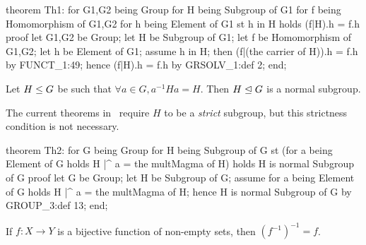 \nwenddocs{}\endmoddef\nwstartdeflinemarkup{}\nwenddeflinemarkup
theorem Th1:
  for G1,G2 being Group
  for H being Subgroup of G1
  for f being Homomorphism of G1,G2
  for h being Element of G1
  st h in H
  holds (f|H).h = f.h
proof
  let G1,G2 be Group;
  let H be Subgroup of G1;
  let f be Homomorphism of G1,G2;
  let h be Element of G1;
  assume h in H;
  then (f|(the carrier of H)).h = f.h by FUNCT_1:49;
  hence (f|H).h = f.h by GRSOLV_1:def 2;
end;
\eatline
{}\nwendcode{}\nwdocspar
\begin{theorem}\label{thm:characteristic:preparatory:normal-subgroup}
Let $H\leq G$ be such that $\forall a\in G, a^{-1}Ha=H$.
Then $H\trianglelefteq G$ is a normal subgroup.
\end{theorem}

\begin{thm-remark}
The current theorems in~ require $H$ to be a \emph{strict}
subgroup, but this strictness condition is not necessary.
\end{thm-remark}


\nwenddocs{}\endmoddef\nwstartdeflinemarkup{}\nwenddeflinemarkup
theorem Th2:
  for G being Group
  for H being Subgroup of G
  st (for a being Element of G holds H |^ a = the multMagma of H)
  holds H is normal Subgroup of G
proof
  let G be Group;
  let H be Subgroup of G;
  assume for a being Element of G holds H |^ a = the multMagma of H;
  hence H is normal Subgroup of G by GROUP_3:def 13;
end;
\eatline
{}\nwendcode{}\nwdocspar
\begin{theorem}\label{thm:characteristic:preparatory:lm10}
If $f\colon X\to Y$ is a bijective function of non-empty sets, then $(f^{-1})^{-1}=f$.
\end{theorem}

